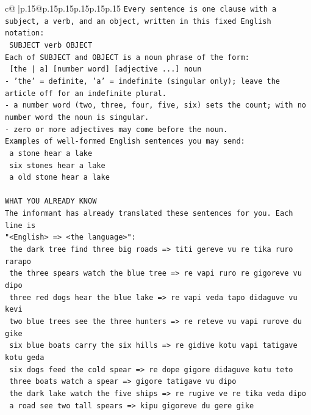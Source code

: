 \documentclass{article}
\begin{document}
{\begin{supertabular}{c@{$\;$}|p{.15\linewidth}@{}p{.15\linewidth}p{.15\linewidth}p{.15\linewidth}p{.15\linewidth}p{.15\linewidth}}
{{{\texttt{Every sentence is one clause with a subject, a verb, and an object, written in this fixed English notation:} \\
\texttt{    SUBJECT  verb  OBJECT} \\
\texttt{Each of SUBJECT and OBJECT is a noun phrase of the form:} \\
\texttt{    {[}the | a{]}  {[}number word{]}  {[}adjective ...{]}  noun} \\
\texttt{{-} 'the' = definite, 'a' = indefinite (singular only); leave the article off for an indefinite plural.} \\
\texttt{{-} a number word (two, three, four, five, six) sets the count; with no number word the noun is singular.} \\
\texttt{{-} zero or more adjectives may come before the noun.} \\
\texttt{Examples of well{-}formed English sentences you may send:} \\
\texttt{    a stone hear a lake} \\
\texttt{    six stones hear a lake} \\
\texttt{    a old stone hear a lake} \\
\\ 
\texttt{WHAT YOU ALREADY KNOW} \\
\texttt{The informant has already translated these sentences for you. Each line is} \\
\texttt{"<English>  =>  <the language>":} \\
\texttt{    the dark tree find three big roads  =>  titi gereve vu re tika ruro rarapo} \\
\texttt{    the three spears watch the blue tree  =>  re vapi ruro re gigoreve vu dipo} \\
\texttt{    three red dogs hear the blue lake  =>  re vapi veda tapo didaguve vu kevi} \\
\texttt{    two blue trees see the three hunters  =>  re reteve vu vapi rurove du gike} \\
\texttt{    six blue boats carry the six hills  =>  re gidive kotu vapi tatigave kotu geda} \\
\texttt{    six dogs feed the cold spear  =>  re dope gigore didaguve kotu teto} \\
\texttt{    three boats watch a spear  =>  gigore tatigave vu dipo} \\
\texttt{    the dark lake watch the five ships  =>  re rugive ve re tika veda dipo} \\
\texttt{    a road see two tall spears  =>  kipu gigoreve du gere gike} \\
}}}
\end{supertabular}}
\end{document}
